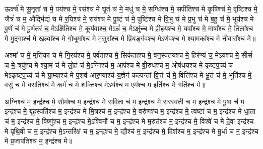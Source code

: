 

ऊर्क्च॑ मे सू॒नृता॑ च मे॒ पय॑श्च मे॒ रस॑श्च मे घृ॒तं च॑ मे॒ मधु॑ च मे॒ सग्धि॑श्च मे॒ सपी॑तिश्च मे कृ॒षिश्च॑ मे॒ वृष्टि॑श्च मे॒ जैत्रं॑ च म॒ औद्भि॑द्यं च मे र॒यिश्च॑ मे॒ राय॑श्च मे पु॒ष्टं च॑ मे॒ पुष्टि॑श्च मे वि॒भु च॑ मे प्र॒भु च॑ मे ब॒हु च॑ मे॒ भूय॑श्च मे पू॒र्णं च॑ मे पू॒र्णत॑रं च॒ मेऽक्षि॑तिश्च मे॒ कूय॑वाश्च॒ मेऽन्नं॑ च॒ मेऽक्षु॑च्च मे व्री॒हय॑श्च मे॒ यवा᳚श्च मे॒ माषा᳚श्च मे॒ तिला᳚श्च मे मु॒द्गाश्च॑ मे ख॒ल्वा᳚श्च मे गो॒धूमा᳚श्च मे म॒सुरा᳚श्च मे प्रि॒यङ्ग॑वश्च॒ मेऽण॑वश्च मे श्या॒मका᳚श्च मे नी॒वारा᳚श्च मे॥ 



अश्मा॑ च मे॒ मृत्ति॑का च मे गि॒रय॑श्च मे॒ पर्व॑ताश्च मे॒ सिक॑ताश्च मे॒ वन॒स्पत॑यश्च मे॒ हिर॑ण्यं च॒ मेऽय॑श्च मे॒ सीसं॑ च मे॒ त्रपु॑श्च मे श्या॒मं च॑ मे लो॒हं च॑ मे॒ऽग्निश्च॑ म॒ आप॑श्च मे वी॒रुध॑श्च म॒ ओष॑धयश्च मे कृष्टप॒च्यं च॑ मेऽकृष्टप॒च्यं च॑ मे ग्रा॒म्याश्च॑ मे प॒शव॑ आर॒ण्याश्च॑ य॒ज्ञेन॑ कल्पन्तां वि॒त्तं च॑ मे॒ वित्ति॑श्च मे भू॒तं च॑ मे॒ भूति॑श्च मे॒ वसु॑ च मे वस॒तिश्च॑ मे॒ कर्म॑ च मे॒ शक्ति॑श्च॒ मेऽर्थ॑श्च म॒ एम॑श्च म॒ इति॑श्च मे॒ गति॑श्च मे॥



अ॒ग्निश्च॑ म॒ इन्द्र॑श्च मे॒ सोम॑श्च म॒ इन्द्र॑श्च मे सवि॒ता च॑ म॒ इन्द्र॑श्च मे॒ सर॑स्वती च म॒ इन्द्र॑श्च मे पू॒षा च॑ म॒ इन्द्र॑श्च मे॒ बृह॒स्पति॑श्च म॒ इन्द्र॑श्च मे मि॒त्रश्च॑ म॒ इन्द्र॑श्च मे॒ वरु॑णश्च म॒ इन्द्र॑श्च मे॒ त्वष्टा॑ च म॒ इन्द्र॑श्च मे धा॒ता च॑ म॒ इन्द्र॑श्च मे॒ विष्णु॑श्च म॒ इन्द्र॑श्च मे॒ऽश्विनौ॑ च म॒ इन्द्र॑श्च मे म॒रुत॑श्च म॒ इन्द्र॑श्च मे॒ विश्वे॑ च मे दे॒वा इन्द्र॑श्च मे पृथि॒वी च॑ म॒ इन्द्र॑श्च मे॒ऽन्तरि॑क्षं च म॒ इन्द्र॑श्च मे॒ द्यौश्च॑ म॒ इन्द्र॑श्च मे॒ दिश॑श्च म॒ इन्द्र॑श्च मे मू॒र्धा च॑ म॒ इन्द्र॑श्च मे प्र॒जाप॑तिश्च म॒ इन्द्र॑श्च मे॥

